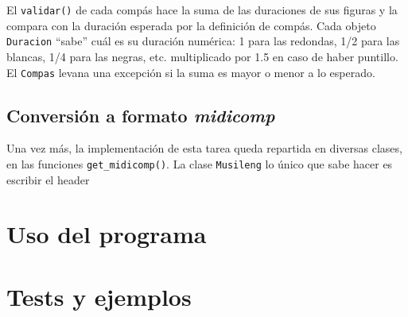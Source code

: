 \documentclass{article}
\begin{document}
El \texttt{validar()} de cada compás hace la suma de las duraciones de sus figuras y la compara con
la duración esperada por la definición de compás.  Cada objeto \texttt{Duracion} ``sabe'' cuál es su
duración numérica: 1 para las redondas, 1/2 para las blancas, 1/4 para las negras, etc.
multiplicado por 1.5 en caso de haber puntillo.  El \texttt{Compas} levana una excepción si la suma
es mayor o menor a lo esperado.


\subsection*{Conversión a formato \emph{midicomp}}
Una vez más, la implementación de esta tarea queda repartida en diversas clases, en las funciones
\texttt{get\_midicomp()}.  La clase \texttt{Musileng} lo único que sabe hacer es escribir el header

\section*{Uso del programa}

\section*{Tests y ejemplos}
\end{document}
